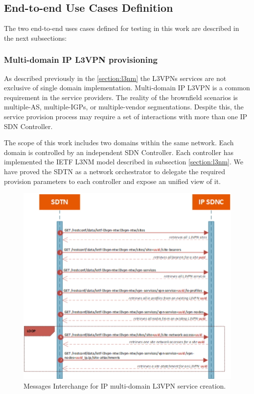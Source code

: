 \documentclass[a4paper,fleqn]{cas-dc}
\begin{document}
\subsection{End-to-end Use Cases Definition}
The two end-to-end uses cases defined for testing in this work are described in the next subsections:

\subsubsection{Multi-domain IP L3VPN provisioning}
\label{section:muli-l3nm}

As described previously in the \cref{section:l3nm} the L3VPNs services are not exclusive of single domain implementation. Multi-domain IP L3VPN is a common requirement in the service providers. The reality of the brownfield scenarios is multiple-AS, multiple-IGPs, or multiple-vendor segmentations. Despite this, the service provision process may require a set of interactions with more than one IP SDN Controller. 

The scope of this work includes two domains within the same network. Each domain is controlled by an independent SDN Controller. Each controller has implemented the IETF L3NM model described in subsection \cref{section:l3nm}. We have proved the SDTN as a network orchestrator to delegate the required provision parameters to each controller and expose an unified view of it.

\begin{figure}
	\centering
		\includegraphics[width=\linewidth]{figs/l3vpn_workflow.png}
	\caption{Messages Interchange for IP multi-domain L3VPN service creation.}
	\label{FIG:l3vpn_workflow}
\end{figure}
\end{document}
